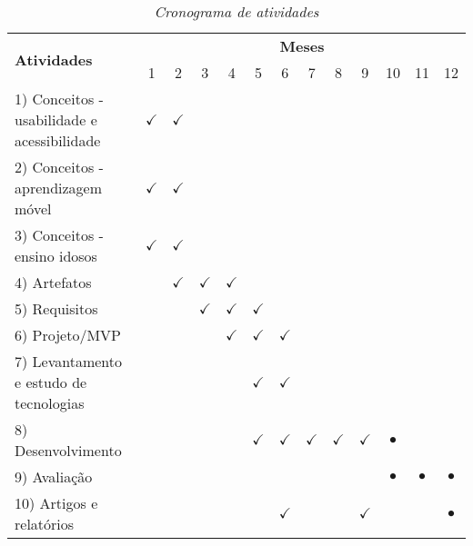 \begin{table}[!ht]
\centering
\caption{\textit{Cronograma de atividades}}
\label{tab:cronograma}
\begin{tabular}{|l|c|c|c|c|c|c|c|c|c|c|c|c|}
\hline
\multirow{2}{*}{\textbf{Atividades}} & \multicolumn{12}{c|}{\textbf{Meses}} \\ \cline{2-13} 
 & 1 & 2 & 3 & 4 & 5 & 6 & 7 & 8 & 9 & 10 & 11 & 12 \\ \hline
1) Conceitos - usabilidade e acessibilidade & $\checkmark$ & $\checkmark$ &  &  &  &  &  &  &  &  &  &  \\ \hline
2) Conceitos - aprendizagem móvel & $\checkmark$ & $\checkmark$ &  &  &  &  &  &  &  &  &  &  \\ \hline
3) Conceitos - ensino idosos & $\checkmark$ & $\checkmark$ &  &  &  &  &  &  &  &  &  &  \\ \hline
4) Artefatos &  & $\checkmark$ & $\checkmark$ & $\checkmark$ &  &  &  &  &  &  &  &  \\ \hline
5) Requisitos &  &  & $\checkmark$ & $\checkmark$ & $\checkmark$ &  &  &  &  &  &  &  \\ \hline
6) Projeto/MVP &  &  &  & $\checkmark$ & $\checkmark$ & $\checkmark$ &  &  &  &  &  &  \\ \hline
7) Levantamento e estudo de tecnologias &  &  &  &  & $\checkmark$ & $\checkmark$ &  &  &  &  &  &  \\ \hline
8) Desenvolvimento &  &  &  &  & $\checkmark$ & $\checkmark$ & $\checkmark$ & $\checkmark$ & $\checkmark$ & $\bullet$ &  &  \\ \hline
9) Avaliação &  &  &  &  &  &  &  &  &  & $\bullet$ & $\bullet$ & $\bullet$ \\ \hline
10) Artigos e relatórios &  &  &  &  &  & $\checkmark$ &  &  & $\checkmark$ &  &  & $\bullet$ \\ \hline
\end{tabular}
\end{table}

